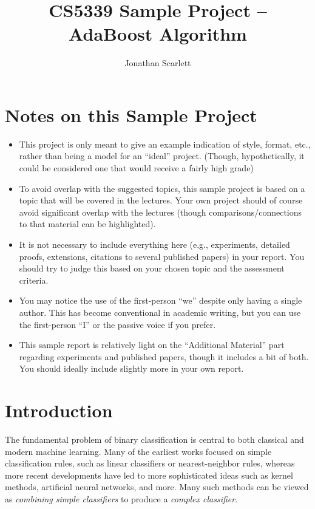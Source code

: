 \documentclass[english]{article}
\title{CS5339 Sample Project -- AdaBoost Algorithm}
\date{}
\author{Jonathan Scarlett}
\begin{document}
\maketitle

{\color{red} 
\section*{Notes on this Sample Project}

\begin{itemize}
    \item This project is only meant to give an example indication of style, format, etc., rather than being a model for an ``ideal'' project.   (Though, hypothetically, it could be considered one that would receive a fairly high grade)
    \item To avoid overlap with the suggested topics, this sample project is based on a topic that will be covered in the lectures.  Your own project should of course avoid significant overlap with the lectures (though comparisons/connections to that material can be highlighted).
    \item It is not necessary to include everything here (e.g., experiments, detailed proofs, extensions, citations to several published papers) in your report.  You should try to judge this based on your chosen topic and the assessment criteria.
    \item You may notice the use of the first-person ``we'' despite only having a single author.  This has become conventional in academic writing, but you can use the first-person ``I'' or the passive voice if you prefer.
    \item This sample report is relatively light on the ``Additional Material'' part regarding experiments and published papers, though it includes a bit of both.  You should ideally include slightly more in your own report.
\end{itemize}
}

\section{Introduction} \label{sec:intro}

The fundamental problem of binary classification is central to both classical and modern machine learning.  Many of the earliest works focused on simple classification rules, such as linear classifiers or nearest-neighbor rules, whereas more recent developments have led to more sophisticated ideas such as kernel methods, artificial neural networks, and more.  Many such methods can be viewed as {\em combining simple classifiers} to produce a {\em complex classifier}.
\end{document}
